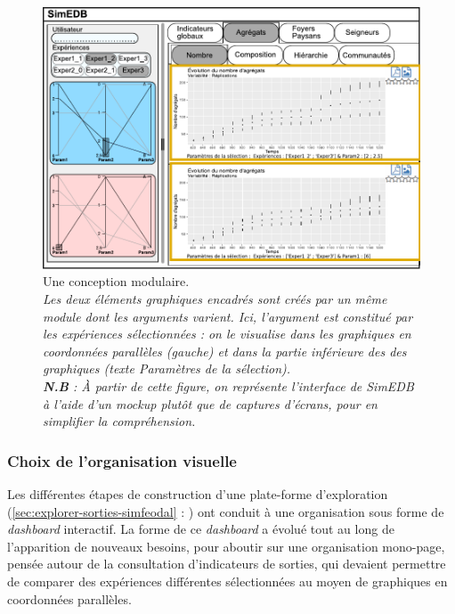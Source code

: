 \begin{figure}[H]
	\centering
	\includegraphics[width=\linewidth]{img/mockup_SimEDB_modules.pdf}
	\caption[Une conception modulaire.]{Une conception modulaire.\\
		\textit{Les deux éléments graphiques encadrés sont créés par un même \og module\fg{} dont les arguments varient.
		Ici, l'argument est constitué par les expériences sélectionnées : on le visualise dans les graphiques en coordonnées parallèles (gauche) et dans la partie inférieure des des graphiques (texte \og Paramètres de la sélection\fg{}).\\
		\textbf{N.B} : À partir de cette figure, on représente l'interface de SimEDB à l'aide d'un \textit{mockup} plutôt que de captures d'écrans, pour en simplifier la compréhension.}}
	\label{fig:simedb-modules}
\end{figure}


\subsubsection{Choix de l'organisation visuelle}

Les différentes étapes de construction d'une plate-forme d'exploration (\cref{sec:explorer-sorties-simfeodal} : ) ont conduit à une organisation sous forme de \textit{dashboard} interactif.
La forme de ce \textit{dashboard} a évolué tout au long de l'apparition de nouveaux besoins, pour aboutir sur une organisation mono-page, pensée autour de la consultation d'indicateurs de sorties, qui devaient permettre de comparer des expériences différentes sélectionnées au moyen de graphiques en coordonnées parallèles.

